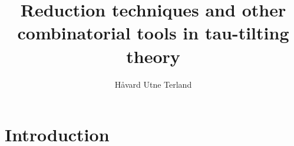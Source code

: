 \documentclass[]{article}
\title{Reduction techniques and other combinatorial tools in tau-tilting theory}
\author{Håvard Utne Terland}
\begin{document}
\maketitle

\begin{abstract}

\end{abstract}

\section{Introduction}
\end{document}
